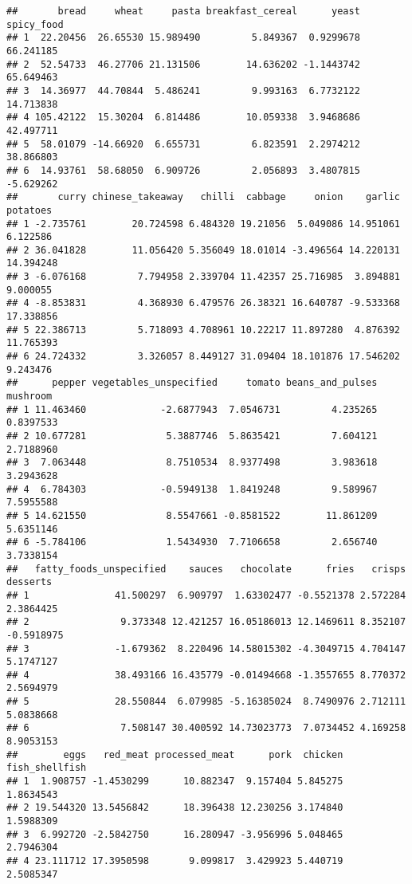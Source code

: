\documentclass[
]{article}
\begin{document}
\begin{verbatim}
##       bread     wheat     pasta breakfast_cereal      yeast spicy_food
## 1  22.20456  26.65530 15.989490         5.849367  0.9299678  66.241185
## 2  52.54733  46.27706 21.131506        14.636202 -1.1443742  65.649463
## 3  14.36977  44.70844  5.486241         9.993163  6.7732122  14.713838
## 4 105.42122  15.30204  6.814486        10.059338  3.9468686  42.497711
## 5  58.01079 -14.66920  6.655731         6.823591  2.2974212  38.866803
## 6  14.93761  58.68050  6.909726         2.056893  3.4807815  -5.629262
##       curry chinese_takeaway   chilli  cabbage     onion    garlic  potatoes
## 1 -2.735761        20.724598 6.484320 19.21056  5.049086 14.951061  6.122586
## 2 36.041828        11.056420 5.356049 18.01014 -3.496564 14.220131 14.394248
## 3 -6.076168         7.794958 2.339704 11.42357 25.716985  3.894881  9.000055
## 4 -8.853831         4.368930 6.479576 26.38321 16.640787 -9.533368 17.338856
## 5 22.386713         5.718093 4.708961 10.22217 11.897280  4.876392 11.765393
## 6 24.724332         3.326057 8.449127 31.09404 18.101876 17.546202  9.243476
##      pepper vegetables_unspecified     tomato beans_and_pulses  mushroom
## 1 11.463460             -2.6877943  7.0546731         4.235265 0.8397533
## 2 10.677281              5.3887746  5.8635421         7.604121 2.7188960
## 3  7.063448              8.7510534  8.9377498         3.983618 3.2943628
## 4  6.784303             -0.5949138  1.8419248         9.589967 7.5955588
## 5 14.621550              8.5547661 -0.8581522        11.861209 5.6351146
## 6 -5.784106              1.5434930  7.7106658         2.656740 3.7338154
##   fatty_foods_unspecified    sauces   chocolate      fries   crisps   desserts
## 1               41.500297  6.909797  1.63302477 -0.5521378 2.572284  2.3864425
## 2                9.373348 12.421257 16.05186013 12.1469611 8.352107 -0.5918975
## 3               -1.679362  8.220496 14.58015302 -4.3049715 4.704147  5.1747127
## 4               38.493166 16.435779 -0.01494668 -1.3557655 8.770372  2.5694979
## 5               28.550844  6.079985 -5.16385024  8.7490976 2.712111  5.0838668
## 6                7.508147 30.400592 14.73023773  7.0734452 4.169258  8.9053153
##        eggs   red_meat processed_meat      pork  chicken fish_shellfish
## 1  1.908757 -1.4530299      10.882347  9.157404 5.845275      1.8634543
## 2 19.544320 13.5456842      18.396438 12.230256 3.174840      1.5988309
## 3  6.992720 -2.5842750      16.280947 -3.956996 5.048465      2.7946304
## 4 23.111712 17.3950598       9.099817  3.429923 5.440719      2.5085347

\end{verbatim}
\end{document}
